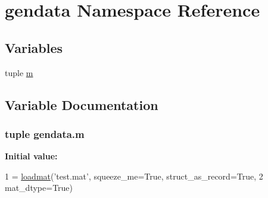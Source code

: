 \hypertarget{namespacegendata}{}\section{gendata Namespace Reference}
\label{namespacegendata}
\subsection*{Variables}
\begin{DoxyCompactItemize}
\item 
tuple \hyperlink{namespacegendata_ae4f67d960ff68c3aa66b78fb3a65dac7}{m}
\end{DoxyCompactItemize}


\subsection{Variable Documentation}
\hypertarget{namespacegendata_ae4f67d960ff68c3aa66b78fb3a65dac7}{}
\subsubsection[{m}]{\setlength{\rightskip}{0pt plus 5cm}tuple gendata.\+m}\label{namespacegendata_ae4f67d960ff68c3aa66b78fb3a65dac7}
{\bfseries Initial value\+:}
\begin{DoxyCode}
1 = \hyperlink{namespacescipy_1_1io_1_1matlab_1_1mio_a4194c31ad8bc64ab0ae7b3d61cd43620}{loadmat}(\textcolor{stringliteral}{'test.mat'}, squeeze\_me=\textcolor{keyword}{True}, struct\_as\_record=\textcolor{keyword}{True},
2         mat\_dtype=\textcolor{keyword}{True})
\end{DoxyCode}
